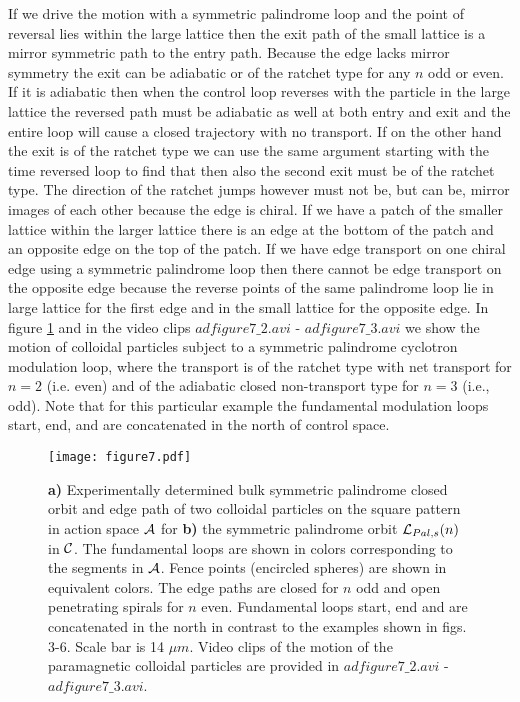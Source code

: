 \documentclass[12pt]{iopart}
\begin{document}
If we drive the motion with a symmetric palindrome loop and the point of reversal lies within the large lattice
then the exit path of the small lattice is a mirror symmetric path to the entry path. Because the edge lacks
mirror symmetry the exit can be adiabatic or of the ratchet type for any $n$ odd or even. If it is adiabatic
then when the control loop reverses with the particle in the large lattice the reversed path must be adiabatic
as well at both entry and exit and the entire loop will cause a closed trajectory with no transport.
If on the other hand the exit is of the ratchet type we can use the same argument starting with the time reversed loop
to find that then also the second exit must be of the ratchet type. The direction of the ratchet jumps however
must not be, but can be, mirror images of each other because the edge is chiral. If we have a patch of the smaller lattice within the larger lattice there is an edge at the bottom of the patch and an opposite edge on the top of the patch. If we have edge transport
on one chiral edge using a symmetric palindrome loop then there cannot be edge transport on the opposite edge
because the reverse points of the same palindrome loop lie in large lattice for the first edge and in the small lattice for the opposite edge.    
In figure \ref{evenmotion} and in the video clips $adfigure7\_2.avi$ - $adfigure7\_3.avi$ we show the motion of
colloidal particles subject to a symmetric palindrome cyclotron modulation loop, where the transport is of the
ratchet type with net transport for $n=2$ (i.e. even) and of the adiabatic closed non-transport type for $n=3$ (i.e., odd).
Note that for this particular example the  fundamental modulation loops start, end, and are concatenated in the north of control space. 

\begin{figure}
	\texttt{[image: figure7.pdf]}
	\caption{ {\bf a)} Experimentally determined bulk symmetric palindrome closed orbit and edge path of two colloidal particles on the square pattern in action space $\cal A$ for {\bf b)} the symmetric palindrome orbit ${\cal L}_{Pal,s}(n)$ in $\cal C$. The fundamental loops are shown in colors corresponding to the segments in ${\cal A}$. Fence points (encircled spheres) are shown in equivalent colors. The edge paths are closed for $n$ odd and open penetrating spirals for $n$ even. Fundamental loops start, end and are concatenated in the north in contrast to the examples shown in figs. 3-6. Scale bar is 14 $\mu m$.   Video clips of the motion of the paramagnetic colloidal particles are provided in $adfigure7\_2.avi$ -  $adfigure7\_3.avi$.}
	\label{evenmotion}
\end{figure}
\end{document}
